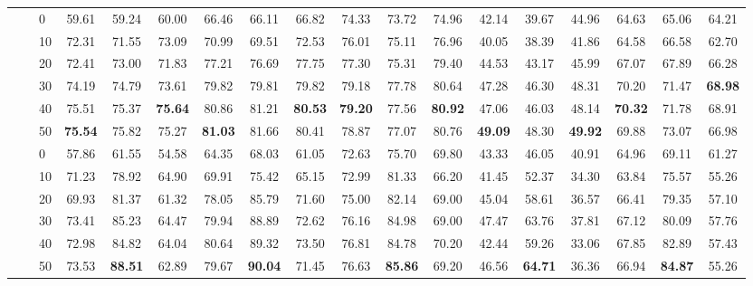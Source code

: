 \begin{table*}[!h]
{\begin{tabular}{lllccc|ccc|ccc|ccc|ccc}
\hline
\arrayrulecolor{gray}\cline{2-18}\arrayrulecolor{black}
\textbf{\multirow{12}{*}{Aspect Category}} & \textbf{\multirow{6}{*}{-}} & 0 & 59.61 & 59.24 & 60.00 & 66.46 & 66.11 & 66.82 & 74.33 & 73.72 & 74.96 & 42.14 & 39.67 & 44.96 & 64.63 & 65.06 & 64.21 \\ 
 \textbf{} & \textbf{} & 10 & 72.31 & 71.55 & 73.09 & 70.99 & 69.51 & 72.53 & 76.01 & 75.11 & 76.96 & 40.05 & 38.39 & 41.86 & 64.58 & 66.58 & 62.70 \\ 
 \textbf{} & \textbf{} & 20 & 72.41 & 73.00 & 71.83 & 77.21 & 76.69 & 77.75 & 77.30 & 75.31 & 79.40 & 44.53 & 43.17 & 45.99 & 67.07 & 67.89 & 66.28 \\ 
 \textbf{} & \textbf{} & 30 & 74.19 & 74.79 & 73.61 & 79.82 & 79.81 & 79.82 & 79.18 & 77.78 & 80.64 & 47.28 & 46.30 & 48.31 & 70.20 & 71.47 & \textbf{68.98} \\ 
 \textbf{} & \textbf{} & 40 & 75.51 & 75.37 & \textbf{75.64} & 80.86 & 81.21 & \textbf{80.53} & \textbf{79.20} & 77.56 & \textbf{80.92} & 47.06 & 46.03 & 48.14 & \textbf{70.32} & 71.78 & 68.91 \\ 
 \textbf{} & \textbf{} & 50 & \textbf{75.54} & 75.82 & 75.27 & \textbf{81.03} & 81.66 & 80.41 & 78.87 & 77.07 & 80.76 & \textbf{49.09} & 48.30 & \textbf{49.92} & 69.88 & 73.07 & 66.98 \\ 
 \arrayrulecolor{gray}\cline{2-18}\arrayrulecolor{black}
\textbf{} & \textbf{\multirow{6}{*}{SC}} & 0 & 57.86 & 61.55 & 54.58 & 64.35 & 68.03 & 61.05 & 72.63 & 75.70 & 69.80 & 43.33 & 46.05 & 40.91 & 64.96 & 69.11 & 61.27 \\ 
 \textbf{} & \textbf{} & 10 & 71.23 & 78.92 & 64.90 & 69.91 & 75.42 & 65.15 & 72.99 & 81.33 & 66.20 & 41.45 & 52.37 & 34.30 & 63.84 & 75.57 & 55.26 \\ 
 \textbf{} & \textbf{} & 20 & 69.93 & 81.37 & 61.32 & 78.05 & 85.79 & 71.60 & 75.00 & 82.14 & 69.00 & 45.04 & 58.61 & 36.57 & 66.41 & 79.35 & 57.10 \\ 
 \textbf{} & \textbf{} & 30 & 73.41 & 85.23 & 64.47 & 79.94 & 88.89 & 72.62 & 76.16 & 84.98 & 69.00 & 47.47 & 63.76 & 37.81 & 67.12 & 80.09 & 57.76 \\ 
 \textbf{} & \textbf{} & 40 & 72.98 & 84.82 & 64.04 & 80.64 & 89.32 & 73.50 & 76.81 & 84.78 & 70.20 & 42.44 & 59.26 & 33.06 & 67.85 & 82.89 & 57.43 \\ 
 \textbf{} & \textbf{} & 50 & 73.53 & \textbf{88.51} & 62.89 & 79.67 & \textbf{90.04} & 71.45 & 76.63 & \textbf{85.86} & 69.20 & 46.56 & \textbf{64.71} & 36.36 & 66.94 & \textbf{84.87} & 55.26 \\ 

\end{tabular}}
\end{table*}
